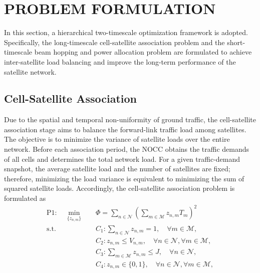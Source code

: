 \documentclass[journal]{IEEEtran}
\newcommand{\revbegin}[1]{\color{revisionblue}\ignorespaces}
\newcommand{\revend}[1]{\color{black}\ignorespaces}
\begin{document}
\section{PROBLEM FORMULATION}
\label{sec:problem-formulation}
In this section, a hierarchical two-timescale optimization framework is adopted. Specifically, the long-timescale cell-satellite association problem and the short-timescale beam hopping and power allocation problem are formulated to achieve inter-satellite load balancing and improve the long-term performance of the satellite network.

\subsection{Cell-Satellite Association}
\label{subsec:cell-satellite-association}
\revbegin{}Due to the spatial and temporal non-uniformity of ground traffic, the cell-satellite association stage aims to balance the forward-link traffic load among satellites. The objective is to minimize the variance of satellite loads over the entire network. Before each association period, the NOCC obtains the traffic demands of all cells and determines the total network load. For a given traffic-demand snapshot, the average satellite load and the number of satellites are fixed; therefore, minimizing the load variance is equivalent to minimizing the sum of squared satellite loads. Accordingly, the cell-satellite association problem is formulated as \revend{}
\begin{equation}
\label{prob:p1}
\begin{aligned}
\mathrm{P1}:\quad
\min_{\{z_{n,m}\}} \quad
& \Phi =
\sum_{n\in\mathcal{N}}
\left(
\sum_{m\in\mathcal{M}} z_{n,m}T_m
\right)^2 \\
\mathrm{s.t.}\quad
& C_1:\sum_{n\in\mathcal{N}}z_{n,m}=1,\quad \forall m\in\mathcal{M},\\
& C_2:z_{n,m}\leq V_{n,m},\quad \forall n\in\mathcal{N},\forall m\in\mathcal{M},\\
& C_3:\sum_{m\in\mathcal{M}}z_{n,m}\leq J,\quad \forall n\in\mathcal{N},\\
& C_4:z_{n,m}\in\{0,1\},\quad \forall n\in\mathcal{N},\forall m\in\mathcal{M},
\end{aligned}
\end{equation}
\end{document}
